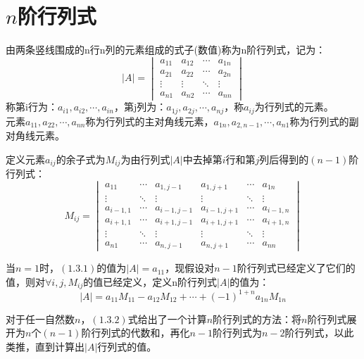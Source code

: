 \documentclass[lang=cn,newtx,10pt,scheme=chinese,thmcnt=section]{elegantbook}
\numberwithin{equation}{section}
\begin{document}
\section{$n$阶行列式}
    由两条竖线围成的n行n列的元素组成的式子(数值)称为n阶行列式，记为：
    \begin{equation}
    |A| = 
    \begin{vmatrix}
    a_{11} & a_{12} & \cdots & a_{1n} \\
    a_{21} & a_{22} & \cdots & a_{2n} \\
    \vdots & \vdots & \ddots & \vdots \\
    a_{n1} & a_{n2} & \cdots & a_{nn}
    \end{vmatrix}
    \end{equation}
    称第i行为：$a_{i1}, a_{i2}, \cdots, a_{in}$，第j列为：$a_{1j}, a_{2j}, \cdots, a_{nj}$，称$a_{ij}$为行列式的元素。\\
    元素$a_{11}, a_{22}, \cdots, a_{nn}$称为行列式的主对角线元素，$a_{1n}, a_{2,n-1}, \cdots, a_{n1}$称为行列式的副对角线元素。
    \begin{definition}
        定义元素$a_{ij}$的余子式为$M_{ij}$为由行列式$|A|$中去掉第$i$行和第$j$列后得到的$(n-1)$阶行列式：
        \[M_{ij} =\begin{vmatrix}
            a_{11} & \cdots & a_{1,j-1} & a_{1,j+1} & \cdots & a_{1n} \\
            \vdots & \ddots & \vdots & \vdots & \ddots & \vdots \\
            a_{i-1,1} & \cdots & a_{i-1,j-1} & a_{i-1,j+1} & \cdots & a_{i-1,n} \\
            a_{i+1,1} & \cdots & a_{i+1,j-1} & a_{i+1,j+1} & \cdots & a_{i+1,n} \\
            \vdots & \ddots & \vdots & \vdots & \ddots & \vdots \\
            a_{n1} & \cdots & a_{n,j-1} & a_{n,j+1} & \cdots & a_{nn}
        \end{vmatrix}\]
    \end{definition}
    \begin{definition}
        当$n=1$时，$(1.3.1)$的值为$|A| = a_{11}$，现假设对$n-1$阶行列式已经定义了它们的值，则对$\forall i,j,M_{ij}$的值已经定义，定义n阶行列式$|A|$的值为：
        \begin{equation}
        |A| = a_{11}M_{11} - a_{12}M_{12} + \cdots + (-1)^{1+n}a_{1n}M_{1n}
        \end{equation}
    \end{definition}
    对于任一自然数$n$，$(1.3.2)$式给出了一个计算$n$阶行列式的方法：将$n$阶行列式展开为$n$个$(n-1)$阶行列式的代数和，再化$n-1$阶行列式为$n-2$阶行列式，以此类推，直到计算出$|A|$行列式的值。
\end{document}
